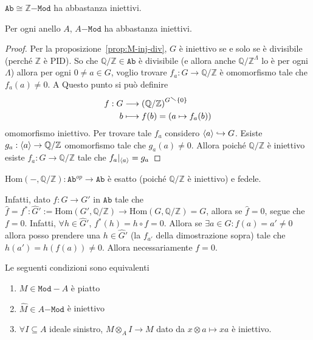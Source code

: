 \begin{proposition}{}
    \(\mathtt{Ab} \cong \mathbb{Z}\mathtt{-Mod}\) ha abbastanza iniettivi.
\end{proposition}
\begin{corollary}{}
    Per ogni anello \(A\), \(A\mathtt{-Mod}\) ha abbastanza iniettivi.
\end{corollary}
\begin{proof}{}
    Per la proposizione~\ref{prop:M-inj-div}, \(G\) è iniettivo se e solo se è
    divisibile (perché \(\mathbb{Z}\) è PID). So che \(\mathbb{Q}/\mathbb{Z} \in
    \mathtt{Ab}\) è divisibile (e allora anche \(\mathbb{Q}/\mathbb{Z} ^{\Lambda}
    \) lo è per ogni \(\Lambda\)) allora per ogni \(0 \neq a \in G\), voglio
    trovare \(f_a : G
    \to \mathbb{Q}/\mathbb{Z}\) è omomorfismo tale che \(f_a{(a)} \neq 0\). A
    Questo punto si può definire 
    \begin{align*}
        f: G &\longrightarrow {(\mathbb{Q}/\mathbb{Z})}^{G \sminus \{0\} } \\
        b &\longmapsto f(b) = {(a \mapsto f_a{(b)})}
    \end{align*}
    omomorfismo iniettivo. Per trovare tale \(f_a\) considero \({\left\langle a\right\rangle}
    \hookrightarrow G\). Esiste \(g_a : {\left\langle a\right\rangle} \to \mathbb{Q}/\mathbb{Z}\)
    omomorfismo tale che \(g_a{(a)} \neq 0\). Allora poiché
    \(\mathbb{Q}/\mathbb{Z}\) è iniettivo esiste \(f_a : G \to
    \mathbb{Q}/\mathbb{Z}\) tale che \(f_a|_{{\left\langle a\right\rangle} } = g_a\) 
\end{proof}

\begin{remark}{}
    \(\mathrm{Hom}{(-, \mathbb{Q}/\mathbb{Z})} : \mathtt{Ab}^{op} \to
    \mathtt{Ab}\) è esatto (poiché \(\mathbb{Q}/\mathbb{Z}\) è iniettivo) e
    fedele.
    
    Infatti, dato \(f : G \to G'\) in \(\mathtt{Ab}\) tale che \(\widehat{f} = f^{*}
    : \widehat{G}' := \mathrm{Hom}{(G', \mathbb{Q}/\mathbb{Z})} \to \mathrm{Hom}{(G,
    \mathbb{Q}/\mathbb{Z})} = G\), allora se \(\widehat{f} = 0\), segue che \(f =
    0\). Infatti, \(\forall h \in \widehat{G}'\), \(f^{*}{(h)} = h \circ f = 0\).
    Allora se \(\exists a \in G : f{(a)} = a' \neq 0\) allora posso prendere una
    \(h \in \widehat{G}'\) (la \(f_{a'}\) della dimostrazione sopra) tale che
    \(h{(a')} = h{(f{(a)})} \neq 0\). Allora necessariamente \(f = 0\).
\end{remark}

\begin{proposition}{}
    Le seguenti condizioni sono equivalenti
\begin{enumerate}[label = \roman*)]
    \item \(M \in \mathtt{Mod}-A\) è piatto
    \item \(\widehat{M} \in A\mathtt{-Mod}\) è iniettivo
    \item \(\forall I \subseteq A \) ideale sinistro, \(M \otimes_A I \to M\)
        dato da \(x \otimes a \mapsto xa\) è iniettivo.
\end{enumerate}
\end{proposition}

